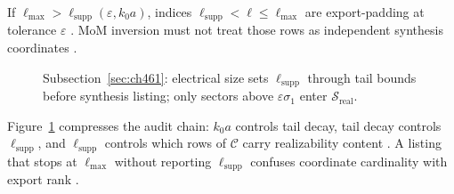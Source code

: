 \begin{corollary}
\label{cor:ch4.listing-vs-supported}
If \(\ell_{\max}>\ell_{\mathrm{supp}}(\varepsilon,k_{0}a)\), indices \(\ell_{\mathrm{supp}}<\ell\le\ell_{\max}\) are export-padding at
tolerance \(\varepsilon\) \cite{hansen1988,harrington2001,devaney2004}. MoM inversion must not treat those rows as independent synthesis
coordinates \cite{harrington2001}.
\end{corollary}

\begin{figure}[t]
\centering
{}
\caption{Subsection~\ref{sec:ch461}: electrical size sets \(\ell_{\mathrm{supp}}\) through tail bounds before synthesis listing; only
sectors above \(\varepsilon\sigma_{1}\) enter \(\mathcal{S}_{\mathrm{real}}\).}
\label{fig:ch4.ell-max-supported}
\end{figure}

Figure~\ref{fig:ch4.ell-max-supported} compresses the audit chain: \(k_{0}a\) controls tail decay, tail decay controls
\(\ell_{\mathrm{supp}}\), and \(\ell_{\mathrm{supp}}\) controls which rows of \(\mathcal{C}\) carry realizability content
\cite{hansen1988,stratton1941}. A listing that stops at \(\ell_{\max}\) without reporting \(\ell_{\mathrm{supp}}\) confuses coordinate
cardinality with export rank \cite{harrington2001,devaney2004}.

